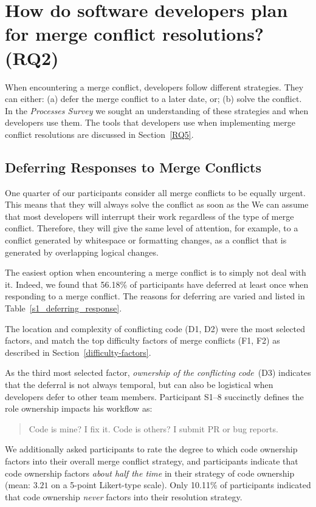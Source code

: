 
\section{How do software developers \textbf{plan} for merge conflict resolutions? (RQ2)}\label{RQ2}

When encountering a merge conflict, developers follow different strategies.
They can either: (a) defer the merge conflict to a later date, or; (b) solve the conflict.
In the \textit{Processes Survey} we sought an understanding of these strategies and when developers use them.
The tools that developers use when implementing merge conflict resolutions are discussed in Section~\ref{RQ5}.

\subsection{Deferring Responses to Merge Conflicts}

One quarter of our participants consider all merge conflicts to be equally urgent.
This means that they will always solve the conflict as soon as the 
We can assume that most developers will interrupt their work regardless of the type of merge conflict.
Therefore, they will give the same level of attention, for example, to a conflict generated by whitespace or formatting changes, as a conflict that is generated by overlapping logical changes. 

The easiest option when encountering a merge conflict is to simply not deal with it.
Indeed, we found that 56.18\% of participants have deferred at least once when responding to a merge conflict.
The reasons for deferring are varied and listed in Table~\ref{s1_deferring_response}.

The location and complexity of conflicting code (D1, D2) were the most selected factors, and match the top difficulty factors of merge conflicts (F1, F2) as described in Section~\ref{difficulty-factors}.

As the third most selected factor, \textit{ownership of the conflicting code}~(D3) indicates that the deferral is not always temporal, but can also be logistical when developers defer to other team members.
Participant S1--8 succinctly defines the role ownership impacts his workflow as:
\begin{quotation}
	Code is mine? I fix it. Code is others? I submit PR or bug reports.
\end{quotation}
We additionally asked participants to rate the degree to which code ownership factors into their overall merge conflict strategy, and participants indicate that code ownership factors \textit{about half the time} in their strategy of code ownership (mean: $3.21$ on a 5-point Likert-type scale).
Only 10.11\% of participants indicated that code ownership \textit{never} factors into their resolution strategy.

